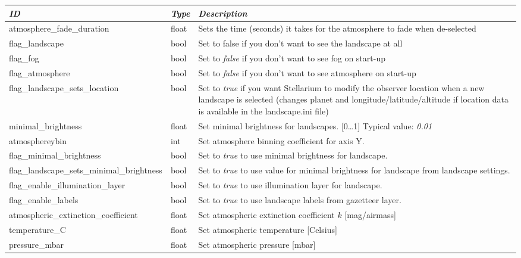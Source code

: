 \begin{longtabu} to \textwidth {l|l|X}\toprule
\emph{ID} & \emph{Type} & \emph{Description}\\\midrule
atmosphere\_fade\_duration      & float & Sets the time (seconds) it takes for the atmosphere to fade when de-selected\\\midrule
flag\_landscape                 & bool & Set to false if you don't want to see the landscape at all\\\midrule
flag\_fog                       & bool & Set to \emph{false} if you don't want to see fog on start-up\\\midrule
flag\_atmosphere                & bool & Set to \emph{false} if you don't want to see atmosphere on start-up\\\midrule
flag\_landscape\_sets\_location & bool & Set to \emph{true} if you want Stellarium to modify the observer location 
                                         when a new landscape is selected (changes planet and longitude/latitude/altitude 
                                         if location data is available in the landscape.ini file)\\\midrule
minimal\_brightness                  & float & Set minimal brightness for landscapes. [0\ldots1] Typical value: \emph{0.01}\\\midrule
atmosphereybin						 & int & Set atmosphere binning coefficient for axis Y.\\\midrule
flag\_minimal\_brightness            & bool & Set to \emph{true} to use minimal brightness for landscape.\\\midrule
flag\_landscape\_sets\_minimal\_brightness & bool & Set to \emph{true} to use value for minimal brightness for landscape from landscape settings.\\\midrule
flag\_enable\_illumination\_layer & bool & Set to \emph{true} to use illumination layer for landscape.\\\midrule
flag\_enable\_labels             & bool & Set to \emph{true} to use landscape labels from gazetteer layer.\\\midrule
atmospheric\_extinction\_coefficient & float & Set atmospheric extinction coefficient $k$ [mag/airmass]\\\midrule
temperature\_C                       & float & Set atmospheric temperature [Celsius]\\\midrule
pressure\_mbar                       & float & Set atmospheric pressure [mbar]\\\bottomrule
\end{longtabu}

